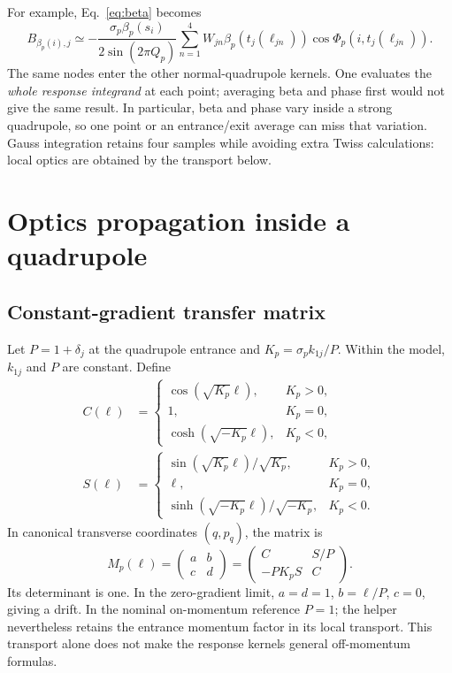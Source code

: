 \documentclass[11pt,a4paper]{article}
\begin{document}
For example, Eq.~\eqref{eq:beta} becomes
\begin{equation}
 B_{\beta_p(i),j}\simeq
 -\frac{\sigma_p\beta_p(s_i)}{2\sin(2\pi Q_p)}
 \sum_{n=1}^4 W_{jn}\beta_p(t_j(\ell_{jn}))
       \cos\Phi_p(i,t_j(\ell_{jn})).
\end{equation}
The same nodes enter the other normal-quadrupole kernels. One evaluates the
\emph{whole response integrand} at each point; averaging beta and phase first
would not give the same result. In particular, beta and phase vary inside a
strong quadrupole, so one point or an entrance/exit average can miss that
variation. Gauss integration retains four samples while avoiding extra Twiss
calculations: local optics are obtained by the transport below.

\section{Optics propagation inside a quadrupole}
\label{app:transport}

\subsection{Constant-gradient transfer matrix}

Let $P=1+\delta_j$ at the quadrupole entrance and
$K_p=\sigma_p k_{1j}/P$. Within the model, $k_{1j}$ and $P$ are constant.
Define
\begin{align}
 C(\ell)&=
 \begin{cases}
 \cos(\sqrt{K_p}\ell), & K_p>0,\\
 1, & K_p=0,\\
 \cosh(\sqrt{-K_p}\ell), & K_p<0,
 \end{cases}\\
 S(\ell)&=
 \begin{cases}
 \sin(\sqrt{K_p}\ell)/\sqrt{K_p}, & K_p>0,\\
 \ell, & K_p=0,\\
 \sinh(\sqrt{-K_p}\ell)/\sqrt{-K_p}, & K_p<0.
 \end{cases}
\end{align}
In canonical transverse coordinates $(q,p_q)$, the matrix is
\begin{equation}
 M_p(\ell)=
 \begin{pmatrix} a&b\\c&d\end{pmatrix}
 =\begin{pmatrix} C&S/P\\-P K_p S&C\end{pmatrix}.
\end{equation}
Its determinant is one. In the zero-gradient limit,
$a=d=1$, $b=\ell/P$, $c=0$, giving a drift. In the nominal on-momentum
reference $P=1$; the helper nevertheless retains the entrance momentum
factor in its local transport. This transport alone does not make the response
kernels general off-momentum formulas.
\end{document}
